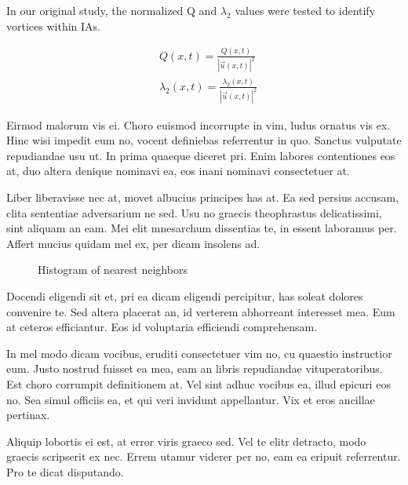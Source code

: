 In our original study, the normalized Q and $\lambda_2$ values were tested to identify vortices within IAs.

\begin{equation}
\begin{aligned}
&Q(x,t) = \frac{Q(x,t)}{|\vec{u}(x,t)|^2} \\
&\lambda_2 (x,t) = \frac{\lambda_2 (x,t)}{|\vec{u}(x,t)|^2}
\end{aligned}
\label{CHAPTER2_normalized_Q_lambda2}
\end{equation}



Eirmod malorum vis ei. Choro euismod incorrupte in vim, ludus ornatus vis ex. 
Hinc wisi impedit eum no, vocent definiebas referrentur in quo. Sanctus 
vulputate repudiandae usu ut. In prima quaeque diceret pri. Enim labores 
contentiones eos at, duo altera denique nominavi ea, eos inani nominavi 
consectetuer at.

Liber liberavisse nec at, movet albucius principes has at. Ea sed persius 
accusam, clita sententiae adversarium ne sed. Usu no graecis theophrastus 
delicatissimi, sint aliquam an eam. Mei elit mnesarchum dissentias te, in 
essent laboramus per. Affert mucius quidam mel ex, per dicam insolens ad.

\begin{figure}[htb]
  \begin{center}
  \end{center}
  \caption{Histogram of nearest neighbors}
  \label{CHAPTER2_FIG01}
\end{figure}

Docendi eligendi sit et, pri ea dicam eligendi percipitur, has soleat 
dolores convenire te. Sed altera placerat an, id verterem abhorreant 
interesset mea. Eum at ceteros efficiantur. Eos id voluptaria efficiendi 
comprehensam. 

In mel modo dicam vocibus, eruditi consectetuer vim no, cu quaestio 
instructior eum. Justo nostrud fuisset ea mea, eam an libris repudiandae 
vituperatoribus. Est choro corrumpit definitionem at. Vel sint adhuc vocibus 
ea, illud epicuri eos no. Sea simul officiis ea, et qui veri invidunt 
appellantur. Vix et eros ancillae pertinax.

Aliquip lobortis ei est, at error viris graeco sed. Vel te elitr detracto, 
modo graecis scripserit ex nec. Errem utamur viderer per no, eam ea eripuit 
referrentur. Pro te dicat disputando. 

